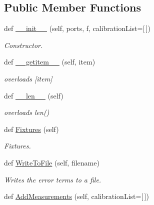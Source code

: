 \subsection*{Public Member Functions}
\begin{DoxyCompactItemize}
\item 
def \hyperlink{classSignalIntegrity_1_1Measurement_1_1Calibration_1_1Calibration_1_1Calibration_a09488d31cef60d14cb3ebfe3f29b963b}{\+\_\+\+\_\+init\+\_\+\+\_\+} (self, ports, f, calibration\+List=\mbox{[}$\,$\mbox{]})
\begin{DoxyCompactList}\small\item\em Constructor. \end{DoxyCompactList}\item 
def \hyperlink{classSignalIntegrity_1_1Measurement_1_1Calibration_1_1Calibration_1_1Calibration_aab91ae2e037c39b631a69273c277bfe9}{\+\_\+\+\_\+getitem\+\_\+\+\_\+} (self, item)
\begin{DoxyCompactList}\small\item\em overloads \mbox{[}item\mbox{]} \end{DoxyCompactList}\item 
def \hyperlink{classSignalIntegrity_1_1Measurement_1_1Calibration_1_1Calibration_1_1Calibration_a810fdc262754b6d21f5acd0e280d4daf}{\+\_\+\+\_\+len\+\_\+\+\_\+} (self)
\begin{DoxyCompactList}\small\item\em overloads len() \end{DoxyCompactList}\item 
def \hyperlink{classSignalIntegrity_1_1Measurement_1_1Calibration_1_1Calibration_1_1Calibration_a083ffd246159ff7b709c6e158f43b76b}{Fixtures} (self)
\begin{DoxyCompactList}\small\item\em Fixtures. \end{DoxyCompactList}\item 
def \hyperlink{classSignalIntegrity_1_1Measurement_1_1Calibration_1_1Calibration_1_1Calibration_a46ccb545422874893d93095446f7c5ac}{Write\+To\+File} (self, filename)
\begin{DoxyCompactList}\small\item\em Writes the error terms to a file. \end{DoxyCompactList}\item 
def \hyperlink{classSignalIntegrity_1_1Measurement_1_1Calibration_1_1Calibration_1_1Calibration_af59f1f79c72d4d05439ca44797972ba0}{Add\+Measurements} (self, calibration\+List=\mbox{[}$\,$\mbox{]})

\end{DoxyCompactItemize}
